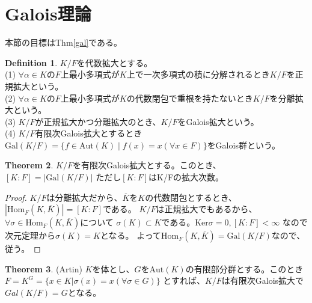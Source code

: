 \documentclass{ltjsarticle}
\theoremstyle{definition}
\newtheorem{definition}{Definition}[section]
\newtheorem{theorem}[definition]{Theorem}
\begin{document}
\section{Galois理論}
本節の目標はThm\ref{gal}である。
\begin{definition}
  $K/F$を代数拡大とする。\\
  (1) $\forall\alpha\in K$の$F$上最小多項式が$K$上で一次多項式の積に分解されるとき$K/F$を正規拡大という。\\
  (2) $\forall\alpha\in K$の$F$上最小多項式が$K$の代数閉包で重根を持たないとき$K/F$を分離拡大という。\\
  (3) $K/F$が正規拡大かつ分離拡大のとき、$K/F$をGalois拡大という。\\
  (4) $K/F$有限次Galois拡大とするとき
        $\mathrm{Gal}(K/F)=\{f\in \mathrm{Aut} (K)\mid f(x)=x(\forall x\in F)\}$をGalois群という。
\end{definition}
\begin{theorem}
  $K/F$を有限次Galois拡大とする。このとき、$[K:F]=\left|\mathrm{Gal}(K/F)\right|$
  ただし$[K:F]$はK/Fの拡大次数。
\end{theorem}
\begin{proof}
  $K/F$は分離拡大だから、$\overline{K}$を$K$の代数閉包とするとき、
  $\left|\mathrm{Hom}_F(K,\overline{K})\right|=[K:F]$である。
  $K/F$は正規拡大でもあるから、$\forall \sigma\in \mathrm{Hom}_F(K,\overline{K})$について
  $\sigma (K)\subset K$である。$\mathrm{Ker} \sigma =0,[K:F]<\infty$
  なので次元定理から$\sigma(K)=K$となる。
  よって$\mathrm{Hom}_F(K,\overline{K})=\mathrm{Gal}(K/F)$なので、従う。
\end{proof}
\begin{theorem}\label{artin}(Artin)
  $K$を体とし、$G$を$\mathrm{Aut}(K)$の有限部分群とする。このとき\\
  $F=K^G=\{x\in K|\sigma (x)=x(\forall\sigma\in G)\}$
  とすれば、$K/F$は有限次Galois拡大で$Gal(K/F)=G$となる。
\end{theorem}
\end{document}
